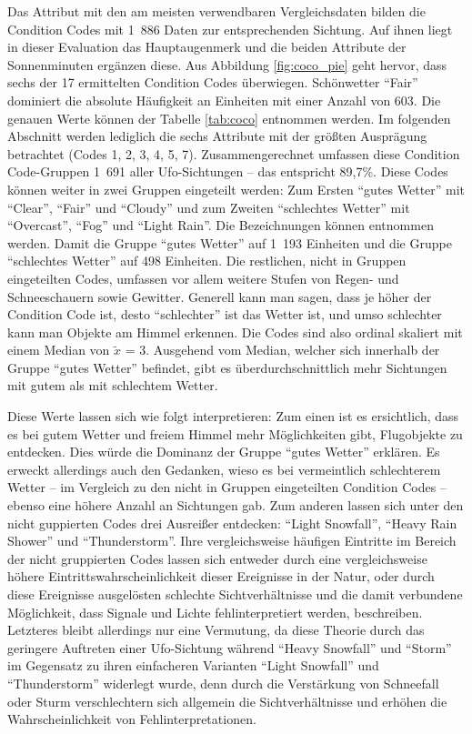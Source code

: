Das Attribut mit den am meisten verwendbaren Vergleichsdaten bilden die Condition Codes mit 1~886 Daten zur entsprechenden Sichtung. Auf ihnen liegt in dieser Evaluation das Hauptaugenmerk und die beiden Attribute der Sonnenminuten ergänzen diese. Aus Abbildung \ref{fig:coco_pie} geht hervor, dass sechs der 17 ermittelten Condition Codes überwiegen. Schönwetter \enquote{Fair} dominiert die absolute Häufigkeit an Einheiten mit einer Anzahl von 603. Die genauen Werte können der Tabelle \ref{tab:coco} entnommen werden. Im folgenden Abschnitt werden lediglich die sechs Attribute mit der größten Ausprägung betrachtet (Codes 1, 2, 3, 4, 5, 7). Zusammengerechnet umfassen diese Condition Code-Gruppen 1~691 aller Ufo-Sichtungen -- das entspricht 89,7\%. Diese Codes können weiter in zwei Gruppen eingeteilt werden: Zum Ersten \enquote{gutes Wetter} mit \enquote{Clear}, \enquote{Fair} und \enquote{Cloudy} und zum Zweiten \enquote{schlechtes Wetter} mit \enquote{Overcast}, \enquote{Fog} und \enquote{Light Rain}. Die Bezeichnungen können \cite{coco:2021} entnommen werden. Damit die Gruppe \enquote{gutes Wetter} auf 1~193 Einheiten und die Gruppe \enquote{schlechtes Wetter} auf 498 Einheiten. Die restlichen, nicht in Gruppen eingeteilten Codes, umfassen vor allem weitere Stufen von Regen- und Schneeschauern sowie Gewitter. Generell kann man sagen, dass je höher der Condition Code ist, desto \enquote{schlechter} ist das Wetter ist, und umso schlechter kann man Objekte am Himmel erkennen. Die Codes sind also ordinal skaliert mit einem Median von $\tilde{x}$ = 3. Ausgehend vom Median, welcher sich innerhalb der Gruppe \enquote{gutes Wetter} befindet, gibt es überdurchschnittlich mehr Sichtungen mit gutem als mit schlechtem Wetter.



Diese Werte lassen sich wie folgt interpretieren: Zum einen ist es ersichtlich, dass es bei gutem Wetter und freiem Himmel mehr Möglichkeiten gibt, Flugobjekte zu entdecken. Dies würde die Dominanz der Gruppe \enquote{gutes Wetter} erklären. Es erweckt allerdings auch den Gedanken, wieso es bei vermeintlich schlechterem Wetter -- im Vergleich zu den nicht in Gruppen eingeteilten Condition Codes -- ebenso eine höhere Anzahl an Sichtungen gab. Zum anderen lassen sich unter den nicht guppierten Codes drei Ausreißer entdecken: \enquote{Light Snowfall}, \enquote{Heavy Rain Shower} und \enquote{Thunderstorm}. Ihre vergleichsweise häufigen Eintritte im Bereich der nicht gruppierten Codes lassen sich entweder durch eine vergleichsweise höhere Eintrittswahrscheinlichkeit dieser Ereignisse in der Natur, oder durch diese Ereignisse ausgelösten schlechte Sichtverhältnisse und die damit verbundene Möglichkeit, dass Signale und Lichte fehlinterpretiert werden, beschreiben. Letzteres bleibt allerdings nur eine Vermutung, da diese Theorie durch das geringere Auftreten einer Ufo-Sichtung während \enquote{Heavy Snowfall} und \enquote{Storm} im Gegensatz zu ihren einfacheren Varianten \enquote{Light Snowfall} und \enquote{Thunderstorm} widerlegt wurde, denn durch die Verstärkung von Schneefall oder Sturm verschlechtern sich allgemein die Sichtverhältnisse und erhöhen die Wahrscheinlichkeit von Fehlinterpretationen.

